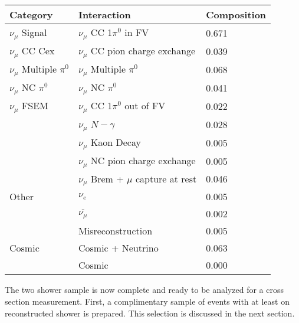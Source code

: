 \begin{table}[H]
\centering
{}
 \begin{tabular}{|l|l|l|}
 \hline
Category & Interaction & Composition \\ [0.1ex] \hline
$\nu_\mu$ Signal & $\nu_\mu$ CC 1$\pi^0$ in FV & 0.671 \\ \hline
$\nu_\mu$ CC Cex & $\nu_\mu$ CC pion charge exchange & 0.039 \\ \hline
$\nu_\mu$ Multiple $\pi^0$ & $\nu_\mu$ Multiple $\pi^0$ & 0.068 \\ \hline
$\nu_\mu$ NC $\pi^0$ & $\nu_\mu$ NC $\pi^0$ & 0.041 \\ \hline
$\nu_\mu$ FSEM & $\nu_\mu$ CC 1$\pi^0$ out of FV & 0.022 \\
& $\nu_\mu$ $N-\gamma$ & 0.028 \\
& $\nu_\mu$ Kaon Decay & 0.005 \\
& $\nu_\mu$ NC pion charge exchange & 0.005 \\ 
&$\nu_\mu$ Brem + $\mu$ capture at rest & 0.046 \\ \hline
Other & $\nu_e$ &0.005 \\
&$\overline{\nu_\mu}$ & 0.002 \\
& Misreconstruction & 0.005 \\ \hline
Cosmic & Cosmic + Neutrino& 0.063 \\
& Cosmic & 0.000 \\ \hline
\end{tabular}
\end{table}

\par The two shower sample is now complete and ready to be analyzed for a cross section measurement. First, a complimentary sample of events with at least on reconstructed shower is prepared. This selection is discussed in the next section.


\clearpage
